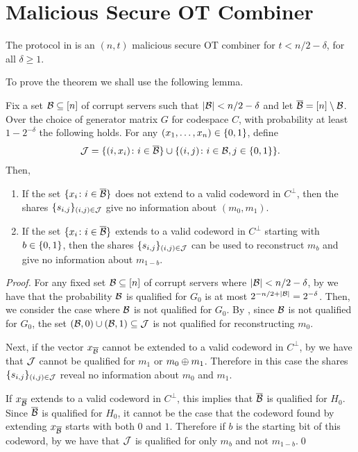 \section{Malicious Secure OT Combiner}



\begin{theorem}\label{thm:main}
	The protocol in  is an $(n,t)$ malicious secure OT combiner for $t < n/2 - \delta$, for all $\delta \geq 1$.
\end{theorem}

To prove the theorem we shall use the following lemma.
\begin{lemma}\label{lem:secret-info}
	Fix a set ${\mathcal B} \subseteq [n]$ of corrupt servers such that $|{\mathcal B}| < n/2 - \delta$ and let $\overline{{\mathcal B}} = [n]\setminus {\mathcal B}$.
	Over the choice of generator matrix $G$ for codespace $C$, with probability at least $1-2^{-\delta}$ the following holds.
	For any $(x_1,\dotsc, x_n) \in {\{0,1\}}$, define
	\begin{align*}
		{\mathcal J} = \{ (i,x_i)\colon i \in \overline{{\mathcal B}} \} \cup \{ (i,j) \colon i \in{\mathcal B}, j \in {\{0,1\}} \}.
	\end{align*}
	Then,
	\begin{enumerate}
		\item If the set $\{x_i \colon i \in \overline{{\mathcal B}} \}$ does not extend to a valid codeword in $C^\perp$, then the shares $\{ s_{i,j} \}_{(i,j) \in {\mathcal J}}$ give no information about $(m_0,m_1)$.
		\item If the set $\{x_i\colon i \in \overline{{\mathcal B}}\}$ extends to a valid codeword in $C^\perp$ starting with $b \in {\{0,1\}}$, then the shares $\{s_{i,j}\}_{(i,j)\in {\mathcal J}}$ can be used to reconstruct $m_b$ and give no information about $m_{1-b}$.
	\end{enumerate}
\end{lemma}
\begin{proof}
	For any fixed set ${\mathcal B}\subseteq [n]$ of corrupt servers where $|{\mathcal B}| < n/2 - \delta$, by  we have that the probability ${\mathcal B}$ is qualified for $G_0$ is at most $2^{-n/2 + |{\mathcal B}|} = 2^{-\delta}$.
	Then, we consider the case where ${\mathcal B}$ is not qualified for $G_0$.
	By , since ${\mathcal B}$ is not qualified for $G_0$, the set $({\mathcal B}, 0) \cup ({\mathcal B},1) \subseteq {\mathcal J}$ is not qualified for reconstructing $m_0$.
	
	Next, if the vector $x_{\overline{{\mathcal B}}}$ cannot be extended to a valid codeword in $C^\perp$, by  we have that ${\mathcal J}$ cannot be qualified for $m_1$ or $m_0 \oplus m_1$.
	Therefore in this case the shares $\{ s_{i,j} \}_{(i,j) \in {\mathcal J}}$ reveal no information about $m_0$ and $m_1$.
	
	If $x_{\overline{{\mathcal B}}}$ extends to a valid codeword in $C^\perp$, this implies that $\overline{{\mathcal B}}$ is qualified for $H_0$.
	Since $\overline{{\mathcal B}}$ is qualified for $H_0$, it cannot be the case that the codeword found by extending $x_{\overline{{\mathcal B}}}$ starts with both $0$ and $1$.
	Therefore if $b$ is the starting bit of this codeword, by  we have that ${\mathcal J}$ is qualified for only $m_b$ and not $m_{1-b}$.\qed
\end{proof}

